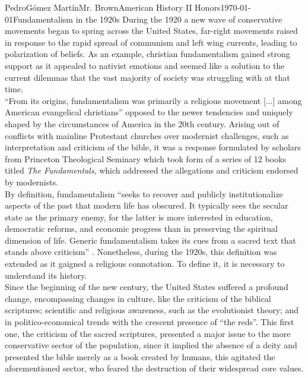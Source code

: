 \documentclass[12pt, letterpaper]{article}
\begin{document}
\begin{mla}{Pedro}{G\'{o}mez Mart\'{i}n}{Mr. Brown}{American History II Honors}{\today}{Fundamentalism in the 1920s}
  During the 1920 a new wave of conservative movements began to spring across the United States, far-right movements raised in response to the rapid spread of communism and left wing currents, leading to polarization of beliefs. As an example, christian fundamentalism gained strong support as it appealed to nativist emotions and seemed like a solution to the current dilemmas that the vast majority of society was struggling with at that time.\\
  “From its origins, fundamentalism was primarily a religious movement [...] among American evangelical christians”\parencite{fundamentalism1} opposed to the newer tendencies and uniquely shaped by the circumstances of America in the 20th century. Arising out of conflicts with mainline Protestant churches over modernist challenges, such as interpretation and criticism of the bible, it was a response formulated by scholars from Princeton Theological Seminary which took form of a series of 12 books titled \textit{The Fundamentals}, which addressed the allegations and criticism endorsed by modernists.\parencite{ChristianFundamentalism}\\ 
  By definition, fundamentalism “seeks to recover and publicly institutionalize aspects of the past that modern life has obscured. It typically sees the secular state as the primary enemy, for the latter is more interested in education, democratic reforms, and economic progress than in preserving the spiritual dimension of life. Generic fundamentalism takes its cues from a sacred text that stands above criticism” \parencite{RiseFundamentalism}. Nonetheless, during the 1920s, this definition was extended as it gaigned a religious connotation. To define it, it is necessary to understand its history.\\
  Since the beginning of the new century, the United States suffered a profound change, encompassing changes in culture, like the criticism of the biblical scriptures; scientific and religious awareness, such as the evolutionist theory; and in politico-economical trends with the crescent presence of “the reds”. This first one, the criticism of the sacred scriptures, presented a major issue to the more conservative sector of the population, since it implied the absence of a deity and presented the bible merely as a book created by humans, this agitated the aforementioned sector, who feared the destruction of their widespread core values.\\

\end{mla}
\end{document}
